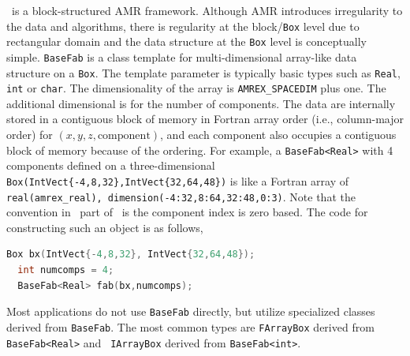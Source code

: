 {\amrex\ is a block-structured AMR framework.  Although AMR introduces
irregularity to the data and algorithms, there is regularity at the
block/{\tt Box} level due to rectangular domain and the data structure
at the {\tt Box} level is conceptually simple.  {\tt BaseFab} is a
class template for multi-dimensional array-like data structure on a
{\tt Box}.  The template parameter is typically basic types such as
{\tt Real}, {\tt int} or {\tt char}.  The dimensionality of the array
is {\tt AMREX\_SPACEDIM} plus one.  The additional dimensional is for
the number of components.  The data are internally stored in a
contiguous block of memory in Fortran array order (i.e., column-major
order) for $(x,y,z,\mathrm{component})$, and each component also
occupies a contiguous block of memory because of the ordering.  For
example, a {\tt BaseFab<Real>} with 4 components defined on a
three-dimensional {\tt Box(IntVect\{-4,8,32\},IntVect\{32,64,48\})} is
like a Fortran array of {\tt real(amrex\_real),
  dimension(-4:32,8:64,32:48,0:3)}.  Note that the convention in \cpp\
part of \amrex\ is the component index is zero based.  The code for
constructing such an object is as follows,
\begin{lstlisting}[language=cpp]
  Box bx(IntVect{-4,8,32}, IntVect{32,64,48});
  int numcomps = 4;
  BaseFab<Real> fab(bx,numcomps);
\end{lstlisting}

Most applications do not use {\tt BaseFab} directly, but utilize
specialized classes derived from {\tt BaseFab}.  The most common types
are {\tt FArrayBox} derived from {\tt BaseFab<Real>} and {\tt
  IArrayBox} derived from {\tt BaseFab<int>}.

}
